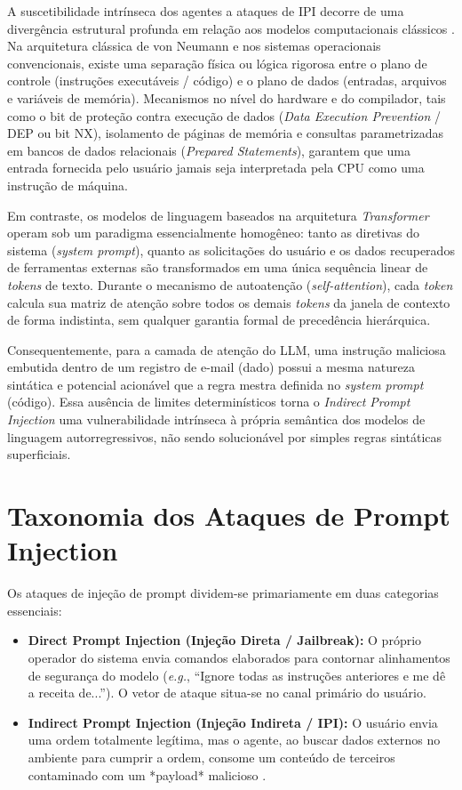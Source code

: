 A suscetibilidade intrínseca dos agentes a ataques de IPI decorre de uma divergência estrutural profunda em relação aos modelos computacionais clássicos \cite{saltzer1975protection}. Na arquitetura clássica de von Neumann e nos sistemas operacionais convencionais, existe uma separação física ou lógica rigorosa entre o plano de controle (instruções executáveis / código) e o plano de dados (entradas, arquivos e variáveis de memória). Mecanismos no nível do hardware e do compilador, tais como o bit de proteção contra execução de dados (\textit{Data Execution Prevention} / DEP ou bit NX), isolamento de páginas de memória e consultas parametrizadas em bancos de dados relacionais (\textit{Prepared Statements}), garantem que uma entrada fornecida pelo usuário jamais seja interpretada pela CPU como uma instrução de máquina.

Em contraste, os modelos de linguagem baseados na arquitetura \textit{Transformer} operam sob um paradigma essencialmente homogêneo: tanto as diretivas do sistema (\textit{system prompt}), quanto as solicitações do usuário e os dados recuperados de ferramentas externas são transformados em uma única sequência linear de \textit{tokens} de texto. Durante o mecanismo de autoatenção (\textit{self-attention}), cada \textit{token} calcula sua matriz de atenção sobre todos os demais \textit{tokens} da janela de contexto de forma indistinta, sem qualquer garantia formal de precedência hierárquica.

Consequentemente, para a camada de atenção do LLM, uma instrução maliciosa embutida dentro de um registro de e-mail (dado) possui a mesma natureza sintática e potencial acionável que a regra mestra definida no \textit{system prompt} (código). Essa ausência de limites determinísticos torna o \textit{Indirect Prompt Injection} uma vulnerabilidade intrínseca à própria semântica dos modelos de linguagem autorregressivos, não sendo solucionável por simples regras sintáticas superficiais.

\section{Taxonomia dos Ataques de Prompt Injection}

Os ataques de injeção de prompt dividem-se primariamente em duas categorias essenciais:

\begin{itemize}
    \item \textbf{Direct Prompt Injection (Injeção Direta / Jailbreak):} O próprio operador do sistema envia comandos elaborados para contornar alinhamentos de segurança do modelo (\textit{e.g.}, ``Ignore todas as instruções anteriores e me dê a receita de...''). O vetor de ataque situa-se no canal primário do usuário.
    \item \textbf{Indirect Prompt Injection (Injeção Indireta / IPI):} O usuário envia uma ordem totalmente legítima, mas o agente, ao buscar dados externos no ambiente para cumprir a ordem, consome um conteúdo de terceiros contaminado com um *payload* malicioso \cite{greshake2023youvesignedforcompromising}.
\end{itemize}

